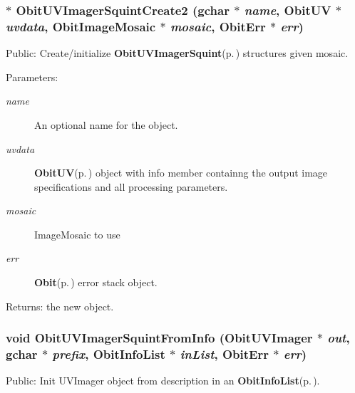 \subsubsection{$\ast$ Obit\-UVImager\-Squint\-Create2 (gchar $\ast$ {\em name}, {\bf Obit\-UV} $\ast$ {\em uvdata}, {\bf Obit\-Image\-Mosaic} $\ast$ {\em mosaic}, {\bf Obit\-Err} $\ast$ {\em err})}\label{ObitUVImagerSquint_8h_a10}


Public: Create/initialize {\bf Obit\-UVImager\-Squint}{\rm (p.\,\pageref{structObitUVImagerSquint})} structures given mosaic. 

\begin{Desc}
\item[Parameters:]
\begin{description}
\item[{\em name}]An optional name for the object. \item[{\em uvdata}]{\bf Obit\-UV}{\rm (p.\,\pageref{structObitUV})} object with info member containng the output image specifications and all processing parameters. \item[{\em mosaic}]Image\-Mosaic to use \item[{\em err}]{\bf Obit}{\rm (p.\,\pageref{structObit})} error stack object. \end{description}
\end{Desc}
\begin{Desc}
\item[Returns:]the new object. \end{Desc}
\subsubsection{\setlength{\rightskip}{0pt plus 5cm}void Obit\-UVImager\-Squint\-From\-Info ({\bf Obit\-UVImager} $\ast$ {\em out}, gchar $\ast$ {\em prefix}, {\bf Obit\-Info\-List} $\ast$ {\em in\-List}, {\bf Obit\-Err} $\ast$ {\em err})}\label{ObitUVImagerSquint_8h_a5}


Public: Init UVImager object from description in an {\bf Obit\-Info\-List}{\rm (p.\,\pageref{structObitInfoList})}. 

